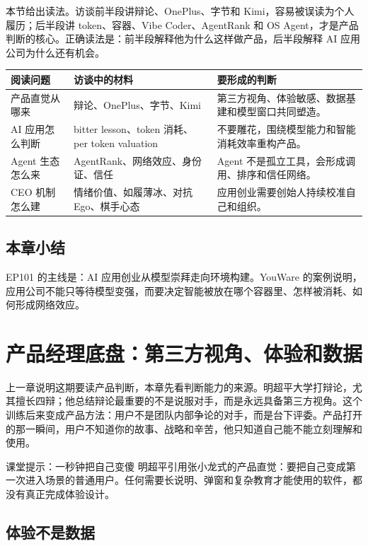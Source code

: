 \documentclass[a4paper]{article}
\begin{document}
本节给出读法。访谈前半段讲辩论、OnePlus、字节和 Kimi，容易被误读为个人履历；后半段讲 token、容器、Vibe Coder、AgentRank 和 OS Agent，才是产品判断的核心。正确读法是：前半段解释他为什么这样做产品，后半段解释 AI 应用公司为什么还有机会。

\noindent\begin{tabularx}{\textwidth}{p{}p{}X}
\toprule
阅读问题 & 访谈中的材料 & 要形成的判断 \\
\midrule
产品直觉从哪来 & 辩论、OnePlus、字节、Kimi & 第三方视角、体验敏感、数据基建和模型窗口共同塑造。 \\
AI 应用怎么判断 & bitter lesson、token 消耗、per token valuation & 不要雕花，围绕模型能力和智能消耗效率重构产品。 \\
Agent 生态怎么来 & AgentRank、网络效应、身份证、信任 & Agent 不是孤立工具，会形成调用、排序和信任网络。 \\
CEO 机制怎么建 & 情绪价值、如履薄冰、对抗 Ego、棋手心态 & 应用创业需要创始人持续校准自己和组织。 \\
\bottomrule
\end{tabularx}

\subsection{本章小结}

EP101 的主线是：AI 应用创业从模型崇拜走向环境构建。YouWare 的案例说明，应用公司不能只等待模型变强，而要决定智能被放在哪个容器里、怎样被消耗、如何形成网络效应。

\section{产品经理底盘：第三方视角、体验和数据}

上一章说明这期要读产品判断，本章先看判断能力的来源。明超平大学打辩论，尤其擅长四辩；他总结辩论最重要的不是说服对手，而是永远具备第三方视角。这个训练后来变成产品方法：用户不是团队内部争论的对手，而是台下评委。产品打开的那一瞬间，用户不知道你的故事、战略和辛苦，他只知道自己能不能立刻理解和使用。

\begin{importantbox}{课堂提示：一秒钟把自己变傻}
明超平引用张小龙式的产品直觉：要把自己变成第一次进入场景的普通用户。任何需要长说明、弹窗和复杂教育才能使用的软件，都没有真正完成体验设计。
\end{importantbox}

\subsection{体验不是数据}
\end{document}
